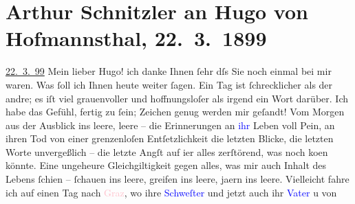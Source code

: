 

               \section[Arthur Schnitzler an Hugo von Hofmannsthal, 22. 3. 1899]{ Arthur Schnitzler an Hugo von Hofmannsthal, 22. 3. 1899}\nopagebreak{}\rehead{ }\normalsize\beginnumbering{} \toendnotes[C]{\smallbreak\pagebreak[2]} 
\toendnotes[C]{\smallbreak}\pstart
           \raggedleft{}{\pb}\uline{22. 3. 99}\pend
           \pstart
           Mein lieber Hugo! ich danke Ihnen ſehr dſs Sie noch einmal bei
                    mir waren. Was ſoll ich Ihnen heute weiter ſagen. Ein Tag ist ſchrecklicher als
                    der andre; es iſt viel grauenvoller und hoffnungsloſer als irgend ein Wort
                    darüber. Ich habe das Gefühl, fertig zu ſein; Zeichen genug werden mir geſandt!
                    Vom Morgen aus der Ausblick ins leere, {\pb}leere – die
                    Erinnerungen an \textcolor{blue}{ihr}{} Leben
                    voll Pein, an ihren Tod von einer grenzenloſen Entſetzlichkeit{\dotstwo} die letzten Blicke, die letzten Worte unvergeßlich
                    – die letzte Angſt auf i{\geminationm}er alles zerſtörend, was
                    noch ko{\geminationm}en könnte. Eine ungeheure Gleichgiltigkeit
                    gegen alles, was mir auch Inhalt des Lebens ſchien – ſchauen ins leere, {\pb}greifen ins leere, ja{\geminationm}ern ins leere.\pend
           \pstart
           Vielleicht fahre ich auf einen Tag nach \textcolor{pink}{Graz}{}\ledrightnote{\textcolor{pink}{Graz}}, wo
                    ihre \textcolor{blue}{Schweſter}{} und jetzt
                    auch ihr \textcolor{blue}{Vater}{} u von

